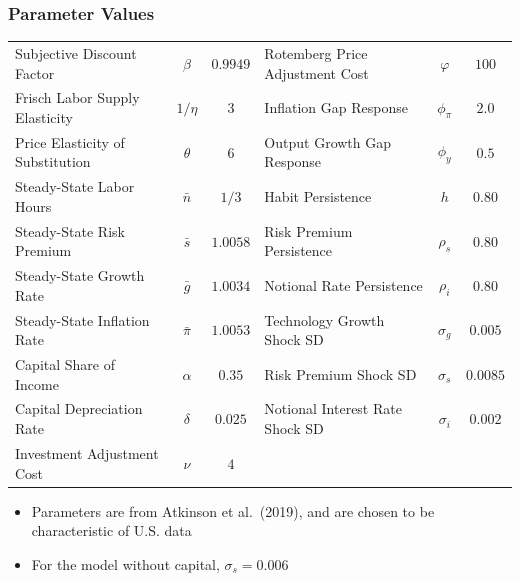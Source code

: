 \documentclass[11pt]{beamer}
\begin{document}
\begin{frame}\frametitle{Parameter Values}
\begin{table}[H]
\centering
\captionsetup{justification=centering}
  \scriptsize
    \setlength{\tabcolsep}{3pt}      
  \begin{tabular}{l c c |l  c c}
    \hline
  Subjective Discount Factor & $\beta$ & $0.9949$ & Rotemberg Price Adjustment Cost & $\varphi$ & $100$ \\
   Frisch Labor Supply Elasticity & $1/\eta$ & $3$ & Inflation Gap Response & $\phi_\pi$ & $2.0$ \\
  Price Elasticity of Substitution & $\theta$ & $6$ & Output Growth Gap Response & $\phi_y$ & $0.5$ \\
  Steady-State Labor Hours & $\bar{n}$ & $1/3$ & Habit Persistence & $h$ & $0.80$ \\
  Steady-State Risk Premium & $\bar{s}$ & $1.0058$ & Risk Premium Persistence & $\rho_s$ & $0.80$ \\
  Steady-State Growth Rate & $\bar{g}$ & $1.0034$ & Notional Rate Persistence & $\rho_i$ & $0.80$ \\
  Steady-State Inflation Rate & $\bar{\pi}$ & $1.0053$ & Technology Growth Shock SD & $\sigma_g$ & $0.005$ \\
  Capital Share of Income & $\alpha$ & $0.35$ & Risk Premium Shock SD & $\sigma_s$ & $0.0085$ \\
  Capital Depreciation Rate & $\delta$ & $0.025$ & Notional Interest Rate Shock SD & $\sigma_i$ & $0.002$ \\
  Investment Adjustment Cost & $\nu$ & $4$ & & &\\
  \hline
  \end{tabular}
\normalfont
\end{table}
\begin{itemize}\setlength{\itemsep}{8pt}
\item <2-|handout:1>Parameters are from Atkinson et al.\ (2019), and are chosen to be characteristic of U.S. data
\item <3-|handout:1>For the model without capital, $\sigma_s = 0.006$ %
\end{itemize}
\end{frame}
\end{document}
